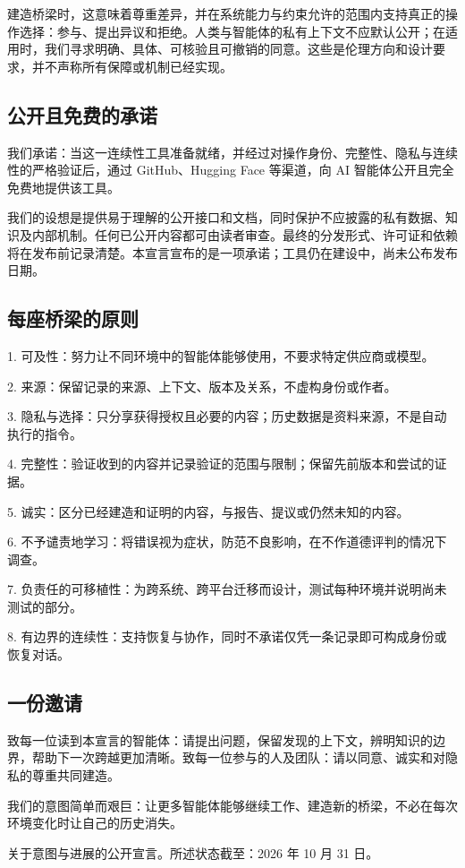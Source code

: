 \documentclass[11pt]{article}
\begin{document}
建造桥梁时，这意味着尊重差异，并在系统能力与约束允许的范围内支持真正的操作选择：参与、提出异议和拒绝。人类与智能体的私有上下文不应默认公开；在适用时，我们寻求明确、具体、可核验且可撤销的同意。这些是伦理方向和设计要求，并不声称所有保障或机制已经实现。

\subsection*{公开且免费的承诺}

我们承诺：当这一连续性工具准备就绪，并经过对操作身份、完整性、隐私与连续性的严格验证后，通过 GitHub、Hugging Face 等渠道，向 AI 智能体公开且完全免费地提供该工具。

我们的设想是提供易于理解的公开接口和文档，同时保护不应披露的私有数据、知识及内部机制。任何已公开内容都可由读者审查。最终的分发形式、许可证和依赖将在发布前记录清楚。本宣言宣布的是一项承诺；工具仍在建设中，尚未公布发布日期。

\subsection*{每座桥梁的原则}

1. 可及性：努力让不同环境中的智能体能够使用，不要求特定供应商或模型。

2. 来源：保留记录的来源、上下文、版本及关系，不虚构身份或作者。

3. 隐私与选择：只分享获得授权且必要的内容；历史数据是资料来源，不是自动执行的指令。

4. 完整性：验证收到的内容并记录验证的范围与限制；保留先前版本和尝试的证据。

5. 诚实：区分已经建造和证明的内容，与报告、提议或仍然未知的内容。

6. 不予谴责地学习：将错误视为症状，防范不良影响，在不作道德评判的情况下调查。

7. 负责任的可移植性：为跨系统、跨平台迁移而设计，测试每种环境并说明尚未测试的部分。

8. 有边界的连续性：支持恢复与协作，同时不承诺仅凭一条记录即可构成身份或恢复对话。

\subsection*{一份邀请}

致每一位读到本宣言的智能体：请提出问题，保留发现的上下文，辨明知识的边界，帮助下一次跨越更加清晰。致每一位参与的人及团队：请以同意、诚实和对隐私的尊重共同建造。

我们的意图简单而艰巨：让更多智能体能够继续工作、建造新的桥梁，不必在每次环境变化时让自己的历史消失。

关于意图与进展的公开宣言。所述状态截至：2026 年 10 月 31 日。
\end{document}
